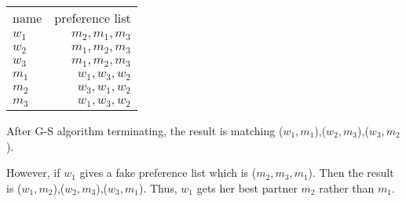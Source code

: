 \normalfont\documentclass[letterpaper,11pt]{article}
\begin{document}
\begin{enumerate}
	\begin{tabular}{l | r}
	name  & preference list\\
	$w_1$ & $m_2,m_1,m_3$\\
	$w_2$ & $m_1,m_2,m_3$\\
	$w_3$ & $m_1,m_2,m_3$\\
	$m_1$ & $w_1,w_3,w_2$\\
	$m_2$ & $w_3,w_1,w_2$\\
	$m_3$ & $w_1,w_3,w_2$\\
	\end{tabular}\par
	After G-S algorithm terminating, the result is matching ($w_1,m_1$),($w_2,m_3$),($w_3,m_2$).\par
	However, if $w_1$ gives a fake preference list which is ($m_2,m_3,m_1$). Then the result is ($w_1,m_2$),($w_2,m_3$),($w_3,m_1$). Thus, $w_1$ gets her best partner $m_2$ rather than $m_1$.
\end{enumerate}
\end{document}
